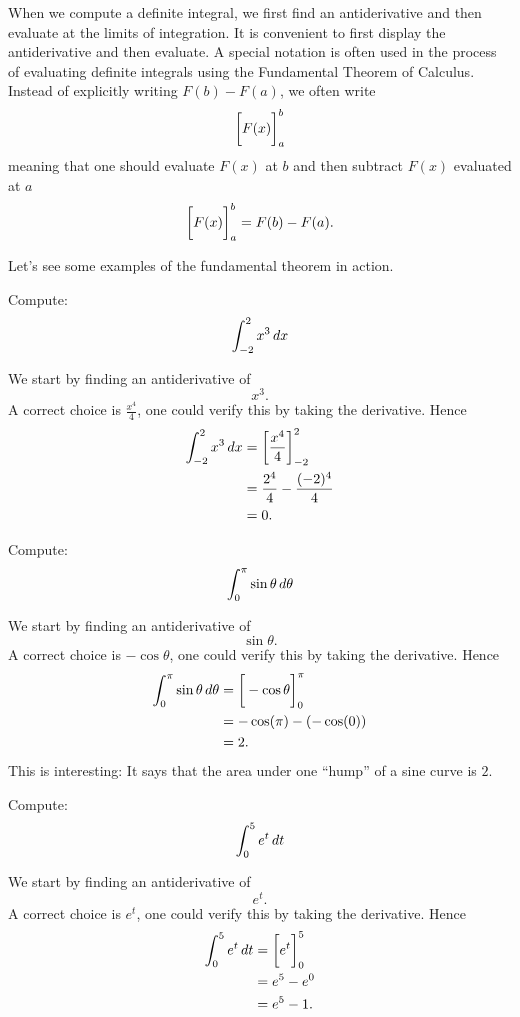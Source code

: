 \documentclass{ximera}
\begin{document}
When we compute a definite integral, we first find an antiderivative
and then evaluate at the limits of integration. It is convenient to
first display the antiderivative and then evaluate.  A special
notation is often used in the process of evaluating definite integrals
using the Fundamental Theorem of Calculus. Instead of explicitly
writing $F(b)-F(a)$, we often write
\[
\bigg[ F(x) \bigg]_a^b
\]
meaning that one should evaluate $F(x)$ at $b$ and then subtract
$F(x)$ evaluated at $a$
\[
\bigg[ F(x) \bigg]_a^b = F(b)-F(a).
\]

Let's see some examples of the fundamental theorem in action.

\begin{example}
  Compute:
  \[
  \int_{-2}^2 x^3\,d x
  \]
  \begin{explanation}
    We start by finding an antiderivative of
    \[
    x^3.
    \]
    A correct choice is $\frac{x^{4}}{4}$, one could verify
    this by taking the derivative. Hence
    \begin{align*}
      \int_{-2}^2 x^3 \,d x &=\bigg[ \frac{x^4}{4} \bigg]_{-2}^2\\
      &= \frac{2^4}{4} - \frac{(-2)^4}{4}\\
      &= 0.
    \end{align*}
  \end{explanation}
\end{example}


\begin{example}
  Compute:
  \[
  \int_0^\pi \sin \theta \,d \theta
  \]
  \begin{explanation}
    We start by finding an antiderivative of
    \[
    \sin \theta.
    \]
    A correct choice is $-\cos\theta$, one could verify
    this by taking the derivative. Hence
    \begin{align*}
      \int_0^\pi \sin\theta \,d \theta &= \bigg[ -\cos\theta \bigg]_0^\pi\\
      &=-\cos(\pi) - (-\cos(0))\\
      &=2.
    \end{align*}
    This is interesting: It says that the area under one ``hump'' of a
    sine curve is $2$.
  \end{explanation}
\end{example}

\begin{example}
  Compute:
  \[
  \int_0^5 e^t\,d t
  \]
  \begin{explanation}
    We start by finding an antiderivative of
    \[
    e^t.
    \]
    A correct choice is $e^t$, one could verify this by taking the
    derivative. Hence
    \begin{align*}
      \int_0^5 e^t \,d t &= \bigg[ e^t \bigg]_0^5 \\
      &= e^5-e^0\\
      &= e^5-1.
    \end{align*}
  \end{explanation}
\end{example}
\end{document}
